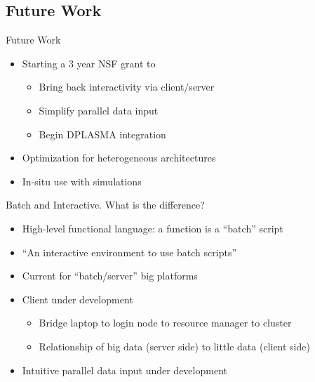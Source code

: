 \subsection{Future Work}

\begin{frame}
  \begin{block}{Future Work}
  \begin{itemize}
    \item Starting a 3 year NSF grant to
      \begin{itemize}
      \item Bring back interactivity via client/server
      \item Simplify parallel data input
      \item Begin DPLASMA integration
      \end{itemize}
    \item Optimization for heterogeneous architectures
    \item In-situ use with simulations
  \end{itemize}
  \end{block}
\end{frame}

\begin{frame}
  \begin{block}{Batch and Interactive. What is the difference?}
    \begin{itemize}
    \item High-level functional language: a function is a ``batch'' script
    \item \R ``An interactive environment to use batch scripts''
    \item Current \pbdR for ``batch/server'' big platforms
    \item Client under development
      \begin{itemize}
      \item Bridge laptop to login node to resource manager to cluster
      \item Relationship of big data (server side) to little data (client side)
      \end{itemize}
    \item Intuitive parallel data input under development
    \end{itemize}
  \end{block}
\end{frame}

